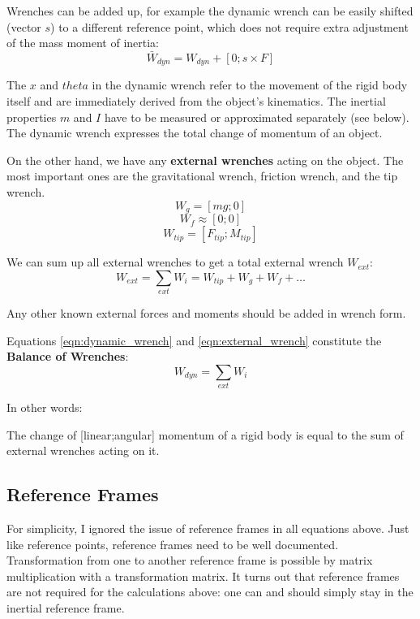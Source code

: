 Wrenches can be added up, for example the dynamic wrench can be easily shifted (vector \(s\)) to a different reference point, which does not require extra adjustment of the mass moment of inertia:
\begin{equation}\label{eqn:shift_wrench}
\bar W_{dyn} = W_{dyn} + \left[ 0; s \times F \right]
\end{equation}


The \(x\) and \(theta\) in the dynamic wrench refer to the movement of the rigid body itself and are immediately derived from the object's kinematics.
The inertial properties \(m\) and \(I\) have to be measured or approximated separately (see below).
The dynamic wrench expresses the total change of momentum of an object.


On the other hand, we have any \textbf{external wrenches} acting on the object.
The most important ones are the gravitational wrench, friction wrench, and the tip wrench.
\[W_{g} = \left[ mg; 0 \right]\]
\[W_{f} \approx \left[ 0; 0 \right]\]
\[W_{tip} = \left[ F_{tip}; M_{tip} \right]\]

We can sum up all external wrenches to get a total external wrench \(W_{ext}\):
\begin{equation}\label{eqn:external_wrench}
W_{ext} = \sum\limits_{ext} W_{i} = W_{tip} +W_{g}+W_{f}+\ldots
\end{equation}

Any other known external forces and moments should be added in wrench form.


Equations \eqref{eqn:dynamic_wrench} and \eqref{eqn:external_wrench} constitute the \textbf{Balance of Wrenches}:
\begin{equation}\label{eqn:balance_of_wrenches}
W_{dyn} = \sum\limits_{ext} W_{i}
\end{equation}

In other words:
\begin{center}
The change of [linear;angular] momentum of a rigid body is equal to the sum of external wrenches acting on it.
\end{center}


\subsection{Reference Frames}
\label{sec:orga8bd4ce}

For simplicity, I ignored the issue of reference frames in all equations above.
Just like reference points, reference frames need to be well documented.
Transformation from one to another reference frame is possible by matrix multiplication with a transformation matrix.
It turns out that reference frames are not required for the calculations above: one can and should simply stay in the inertial reference frame.

